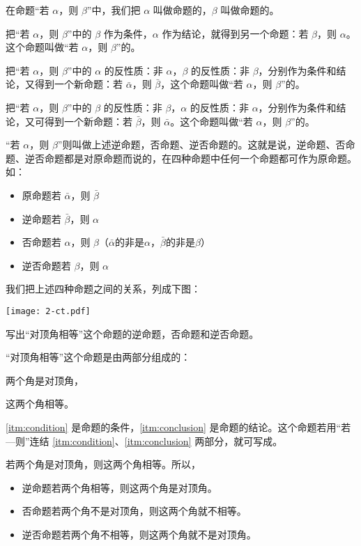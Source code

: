 在命题“若 $\alpha$，则 $\beta$”中，我们把 $\alpha$ 叫做命题的，$\beta$ 叫做命题的。

把“若 $\alpha$，则 $\beta$”中的 $\beta$ 作为条件，$\alpha$ 作为结论，就得到另一个命题：若 $\beta$，则 $\alpha$。这个命题叫做“若 $\alpha$，则 $\beta$”的。

把“若 $\alpha$，则 $\beta$”中的 $\alpha$ 的反性质：非 $\alpha$，$\beta$ 的反性质：非 $\beta$，分别作为条件和结论，又得到一个新命题：若 $\bar\alpha$，则 $\bar\beta$，这个命题叫做“若 $\alpha$，则 $\beta$”的。

把“若 $\alpha$，则 $\beta$”中的 $\beta$ 的反性质：非 $\beta$，$\alpha$ 的反性质：非 $\alpha$，分别作为条件和结论，又可得到一个新命题：若 $\bar\beta$，则 $\bar\alpha$。这个命题叫做“若 $\alpha$，则 $\beta$”的。

“若 $\alpha$，则 $\beta$”则叫做上述逆命题，否命题、逆否命题的。这就是说，逆命题、否命题、逆否命题都是对原命题而说的，在四种命题中任何一个命题都可作为原命题。如：
\begin{itemize}
	\item 原命题\quad 若 $\bar\alpha$，则 $\bar\beta$
	\item 逆命题\quad 若 $\bar\beta$，则 $\alpha$
	\item 否命题\quad 若 $\alpha$，则 $\beta$（$\bar\alpha$的非是$\alpha$，$\bar\beta$的非是$\beta$）
	\item 逆否命题\quad 若 $\beta$，则 $\alpha$
\end{itemize}

我们把上述四种命题之间的关系，列成下图：
\begin{figurehere}
	\texttt{[image: 2-ct.pdf]}
\end{figurehere}

\begin{example}
写出“对顶角相等”这个命题的逆命题，否命题和逆否命题。
\end{example}

\begin{solution}
	“对顶角相等”这个命题是由两部分组成的：
	\begin{enumerate*}
		\item\label{itm:condition} 两个角是对顶角，
		\item\label{itm:conclusion} 这两个角相等。
	\end{enumerate*}
	\ref{itm:condition} 是命题的条件，\ref{itm:conclusion} 是命题的结论。这个命题若用“若—则”连结 \ref{itm:condition}、\ref{itm:conclusion} 两部分，就可写成。
	
	若两个角是对顶角，则这两个角相等。所以，
	\begin{itemize}
		\item 逆命题\quad 若两个角相等，则这两个角是对顶角。
		\item 否命题\quad 若两个角不是对顶角，则这两个角就不相等。
		\item 逆否命题\quad 若两个角不相等，则这两个角就不是对顶角。
	\end{itemize}
\end{solution}

